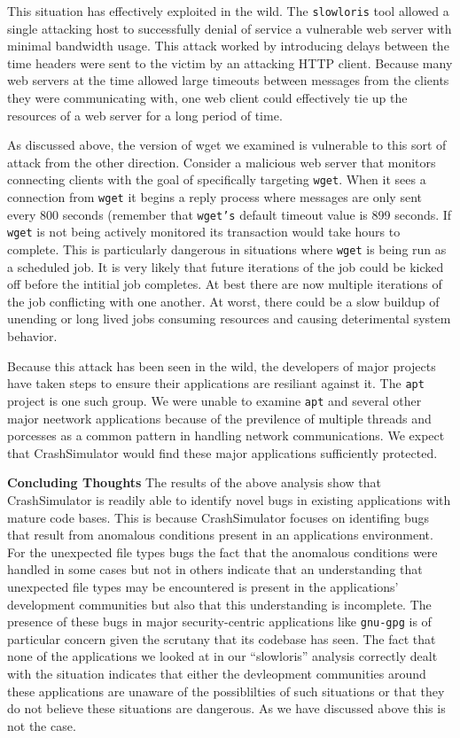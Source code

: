 This situation has effectively exploited in the wild.  The {\tt slowloris} tool
allowed a single attacking host to successfully denial of service a vulnerable
web server with minimal bandwidth usage.  This attack worked by introducing
delays between the time headers were sent to the victim by an attacking HTTP
client.  Because many web servers at the time allowed large timeouts between
messages from the clients they were communicating with, one web client could
effectively tie up the resources of a web server for a long period of time.

As discussed above, the version of wget we examined is vulnerable to this sort
of attack from the other direction.  Consider a malicious web server that
monitors connecting clients with the goal of specifically targeting {\tt wget}.
When it sees a connection from {\tt wget} it begins a reply process where
messages are only sent every 800 seconds (remember that {\tt wget's} default
timeout value is 899 seconds.  If {\tt wget} is not being actively monitored its
transaction would take hours to complete.  This is particularly dangerous in
situations where {\tt wget} is being run as a scheduled job.  It is very likely
that future iterations of the job could be kicked off before the intitial job
completes.  At best there are now multiple iterations of the job conflicting
with one another.  At worst, there could be a slow buildup of unending or long
lived jobs consuming resources and causing deterimental system behavior.

Because this attack has been seen in the wild, the developers of major projects
have taken steps to ensure their applications are resiliant against it.  The
{\tt apt} project is one such group.  We were unable to examine {\tt apt} and
several other major neetwork applications because of the previlence of multiple
threads and porcesses as a common pattern in handling network communications.
We expect that CrashSimulator would find these major applications sufficiently
protected.


{\bf Concluding Thoughts}
The results of the above analysis show that CrashSimulator is readily able to
identify novel bugs in existing applications with mature code bases.  This is
because CrashSimulator focuses on identifing bugs that result from anomalous
conditions present in an applications environment.  For the unexpected file
types bugs the fact that the anomalous conditions were handled in some cases but
not in others indicate that an understanding that unexpected file types may be
encountered is present in the applications' development communities but also
that this understanding is incomplete.  The presence of these bugs in major
security-centric applications like {\tt gnu-gpg} is of particular concern given
the scrutany that its codebase has seen.  The fact that none of the applications
we looked at in our ``slowloris'' analysis correctly dealt with the situation
indicates that either the devleopment communities around these applications are
unaware of the possiblilties of such situations or that they do not believe
these situations are dangerous.  As we have discussed above this is not the
case.


